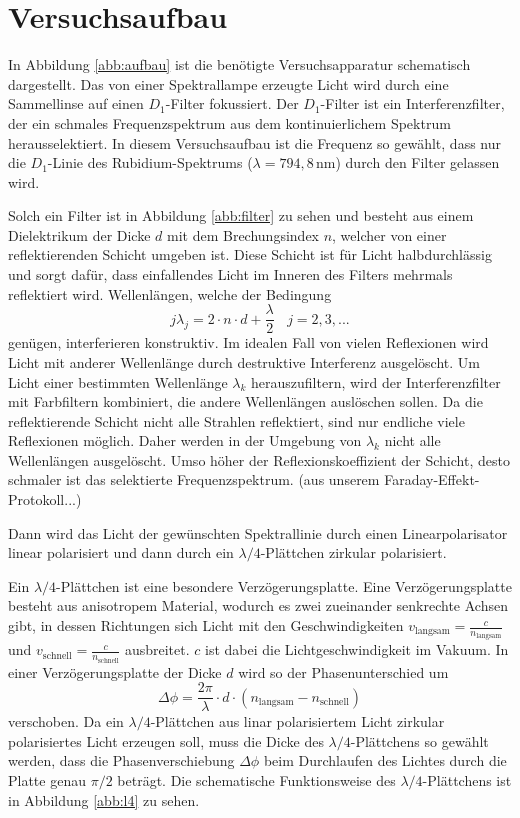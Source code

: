 \section{Versuchsaufbau}
In Abbildung \ref{abb:aufbau} ist die benötigte Versuchsapparatur schematisch dargestellt.
Das von einer Spektrallampe erzeugte Licht wird durch eine Sammellinse auf einen $D_1$-Filter fokussiert. Der $D_1$-Filter ist ein Interferenzfilter, der ein schmales Frequenzspektrum aus dem kontinuierlichem Spektrum herausselektiert. In diesem Versuchsaufbau ist die Frequenz so gewählt, dass nur die $D_1$-Linie des Rubidium-Spektrums ($\lambda=794,8\,\text{nm}$) durch den Filter gelassen wird.

Solch ein Filter ist in Abbildung \ref{abb:filter} zu sehen und besteht aus einem Dielektrikum der Dicke $d$ mit dem Brechungsindex $n$, welcher von einer reflektierenden Schicht umgeben ist.
Diese Schicht ist für Licht halbdurchlässig und sorgt dafür, dass einfallendes Licht im Inneren des Filters mehrmals reflektiert wird.
Wellenlängen, welche der Bedingung
\begin{equation}
  j\lambda_j=2\cdot n\cdot d +\frac{\lambda}{2}~~~~j=2,3,...
\end{equation}
genügen, interferieren konstruktiv.
Im idealen Fall von vielen Reflexionen wird Licht mit anderer Wellenlänge durch destruktive Interferenz ausgelöscht.
Um Licht einer bestimmten Wellenlänge $\lambda_k$ herauszufiltern, wird der Interferenzfilter mit Farbfiltern kombiniert, die andere Wellenlängen auslöschen sollen.
Da die reflektierende Schicht nicht alle Strahlen reflektiert, sind nur endliche viele Reflexionen möglich.
Daher werden in der Umgebung von $\lambda_k$ nicht alle Wellenlängen ausgelöscht.
Umso höher der Reflexionskoeffizient der Schicht, desto schmaler ist das selektierte Frequenzspektrum. (aus unserem Faraday-Effekt-Protokoll...)

Dann wird das Licht der gewünschten Spektrallinie durch einen Linearpolarisator linear polarisiert und dann durch ein $\lambda/4$-Plättchen zirkular polarisiert.

Ein $\lambda/4$-Plättchen ist eine besondere Verzögerungsplatte.
Eine Verzögerungsplatte besteht aus anisotropem Material, wodurch  es zwei zueinander senkrechte Achsen gibt, in dessen Richtungen sich Licht mit den Geschwindigkeiten $v_\text{langsam}=\frac{c}{n_\text{langsam}}$ und $v_\text{schnell}=\frac{c}{n_\text{schnell}}$ ausbreitet. $c$ ist dabei die Lichtgeschwindigkeit im Vakuum.
In einer Verzögerungsplatte der Dicke $d$ wird so der Phasenunterschied um
\begin{equation*}
  \Delta \phi=\frac{2\pi}{\lambda}\cdot d \cdot (n_\text{langsam}-n_\text{schnell})
\end{equation*}
verschoben.
Da ein $\lambda/4$-Plättchen aus linar polarisiertem Licht zirkular polarisiertes Licht erzeugen soll, muss die Dicke des $\lambda/4$-Plättchens so gewählt werden, dass die Phasenverschiebung $\Delta \phi$ beim Durchlaufen des Lichtes durch die Platte genau $\pi/2$ beträgt. Die schematische Funktionsweise des $\lambda/4$-Plättchens ist in Abbildung \ref{abb:l4} zu sehen.

